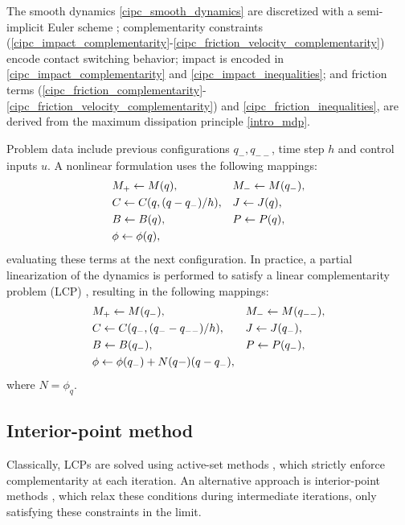 The smooth dynamics \eqref{cipc_smooth_dynamics} are discretized with a semi-implicit Euler scheme \cite{marsden2001discrete}; complementarity constraints (\ref{cipc_impact_complementarity}-\ref{cipc_friction_velocity_complementarity}) encode contact switching behavior; impact is encoded in \eqref{cipc_impact_complementarity} and \eqref{cipc_impact_inequalities}; and friction terms (\ref{cipc_friction_complementarity}-\ref{cipc_friction_velocity_complementarity}) and \eqref{cipc_friction_inequalities}, are derived from the maximum dissipation principle \eqref{intro_mdp}.

Problem data include previous configurations $q_{-}, q_{--}$, time step $h$ and control inputs $u$. A nonlinear formulation uses the following mappings:
\begin{align}
	&M_{+} \leftarrow M(q), 
	&&M_{-} \leftarrow M(q_{-}), \notag \\ 
	&C \leftarrow C(q, (q - q_{-}) / h), 
	&&J \leftarrow J(q),  \\ 
	&B \leftarrow B(q), 
	&& P \leftarrow P(q), \notag \\ 
	& \phi \leftarrow \phi(q), \notag
\end{align}
evaluating these terms at the next configuration. In practice, a partial linearization of the dynamics is performed to satisfy a linear complementarity problem (LCP) \cite{stewart1996implicit}, resulting in the following mappings:
\begin{align}
	&M_{+} \leftarrow M(q_{-}), 
	&&M_{-} \leftarrow M(q_{--}), \notag \\ 
	&C \leftarrow C(q_{-}, (q_{-} - q_{--}) / h), 
	&&J \leftarrow J(q_{-}),  \\ 
	&B \leftarrow B(q_{-}), 
	&& P \leftarrow P(q_{-}), \notag \\
	& \phi \leftarrow \phi(q_{-}) + N(q{-}) (q - q_{-}), \notag
\end{align}
where $N = \phi_q$.

\subsection{Interior-point method}
Classically, LCPs are solved using active-set methods \cite{dirkse1995path}, which strictly enforce complementarity at each iteration. An alternative approach is interior-point methods \cite{kojima1991unified, nocedal2006numerical}, which relax these conditions during intermediate iterations, only satisfying these constraints in the limit.


